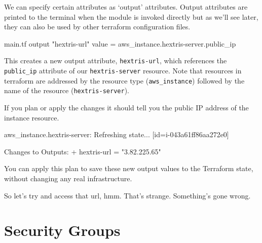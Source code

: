 \documentclass{csse4400}
\begin{document}
We can specify certain attributes as `output' attributes.
Output attributes are printed to the terminal when the module is invoked directly
but as we'll see later, they can also be used by other terraform configuration files.

\begin{code}[language=terraform]{main.tf}
output "hextris-url" {
  value = aws_instance.hextris-server.public_ip
}
\end{code}

This creates a new output attribute, \texttt{hextris-url},
which references the \texttt{public\_ip} attribute of our \texttt{hextris-server} resource.
Note that resources in terraform are addressed by the resource type (\texttt{aws\_instance})
followed by the name of the resource (\texttt{hextris-server}).

If you plan or apply the changes it should tell you the public IP address of the instance resource.

\begin{code}[language=terraform-plan]{}
aws_instance.hextris-server: Refreshing state... [id=i-043a61ff86aa272e0]

Changes to Outputs:
  + hextris-url = "3.82.225.65"

You can apply this plan to save these new output values to the Terraform state, without changing any real infrastructure.  
\end{code}

So let's try and access that url, hmm.
That's strange. Something's gone wrong.

\section{Security Groups}


\end{document}
